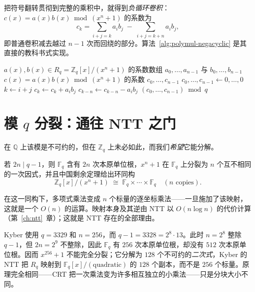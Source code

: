 把符号翻转贯彻到完整的乘积中，就得到\emph{负循环卷积}：$c(x)=a(x)b(x) \bmod (x^n+1)$ 的系数为
\[
c_k = \sum_{i+j=k} a_i b_j \;-\; \sum_{i+j=k+n} a_i b_j,
\]
即普通卷积减去越过 $n-1$ 次而回绕的部分。算法~\ref{alg:polymul-negacyclic} 是其直接的教科书式实现。

\begin{algorithm}[H]
\caption{模 $x^n+1$ 的多项式乘法}
\label{alg:polymul-negacyclic}
\begin{algorithmic}[1]
\Require $a(x),b(x)\in R_q=\mathbb{Z}_q[x]/(x^n+1)$ 的系数数组 $a_0,\dots,a_{n-1}$ 与 $b_0,\dots,b_{n-1}$
\Ensure $c(x)=a(x)b(x)\bmod(x^n+1)$ 的系数 $c_0,\dots,c_{n-1}$
\State $c_0,\dots,c_{n-1} \gets 0,\dots,0$
        \State $k \gets i+j$
            \State $c_k \gets c_k + a_i b_j$ 
        \Else
            \State $c_{k-n} \gets c_{k-n} - a_i b_j$ 
        \EndIf
    \EndFor
\EndFor
\State \Return $(c_0,\dots,c_{n-1}) \bmod q$
\end{algorithmic}
\end{algorithm}

\section{模 $q$ 分裂：通往 NTT 之门}
在 $\mathbb{Q}$ 上该模是不可约的，但在 $\mathbb{Z}_q$ 上未必如此，而我们\emph{希望}它能分解。

\begin{proposition}[完全分裂]
若 $2n \mid q-1$，则 $\mathbb{F}_q$ 含有 $2n$ 次本原单位根，$x^n+1$ 在 $\mathbb{F}_q$ 上分裂为 $n$ 个互不相同的一次因式，并且中国剩余定理给出环同构
\[
\mathbb{Z}_q[x]/(x^n+1) \;\cong\; \mathbb{F}_q \times \cdots \times \mathbb{F}_q \quad (n\text{ copies}).
\]
\end{proposition}

在这一同构下，多项式乘法变成 $n$ 个标量的逐坐标乘法——一旦施加了该映射，这就是一个 $O(n)$ 的运算。映射本身及其逆由 NTT 以 $O(n\log n)$ 的代价计算（第~\ref{ch:ntt}~章）；这就是 NTT 存在的全部理由。

\begin{remark}
Kyber 使用 $q=3329$ 和 $n=256$，而 $q-1 = 3328 = 2^8\cdot 13$。此时 $n=2^8$ 整除 $q-1$，但 $2n=2^9$ 不整除，因此 $\mathbb{F}_q$ 有 $256$ 次本原单位根，却没有 $512$ 次本原单位根。因而 $x^{256}+1$ 不能完全分裂；它分解为 $128$ 个不可约的\emph{二次式}，Kyber 的 NTT 把 $R_q$ 映射到 $\mathbb{F}_q[x]/(\text{quadratic})$ 的 $128$ 个副本，而不是 $256$ 个标量。原理完全相同——CRT 把一次乘法变为许多相互独立的小乘法——只是分块大小不同。
\end{remark}

